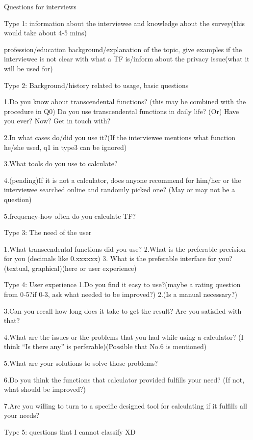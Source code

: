 \documentclass[12pt]{article}
\begin{document}
{\huge Questions for interviews} 
 
Type 1: information about the interviewee and knowledge about the survey(this would take about 4-5 mins)

profession/education background/explanation of the topic, give examples if the interviewee is not clear with what a TF is/inform about the privacy issue(what it will be used for)

Type 2: Background/history related to usage, basic questions

1.Do you know about transcendental functions? (this may be combined with the procedure in Q0)
Do you use transcendental functions in daily life?
(Or) Have you ever? Now? Get in touch with?

2.In what cases do/did you use it?(If the interviewee mentions what function he/she used, q1 in type3 can be ignored)
 
3.What tools do you use to calculate?

4.(pending)If it is not a calculator, does anyone recommend for him/her or the interviewee searched online and randomly picked one? (May or may not be a question)

5.frequency-how often do you calculate TF?

Type 3: The need of the user

1.What transcendental functions did you use?
2.What is the preferable precision for you (decimals like 0.xxxxxx)
3. What is the preferable interface for you? (textual, graphical)(here or user experience)
 
Type 4: User experience
1.Do you find it easy to use?(maybe a rating question from 0-5?if 0-3, ask what needed to be improved?)
2.(Is a manual necessary?)

3.Can you recall how long does it take to get the result? Are you satisfied with that?

4.What are the issues or the problems that you had while using a calculator?
(I think “Is there any” is perferable)(Possible that No.6 is mentioned)

5.What are your solutions to solve those problems?

6.Do you think the functions that calculator provided fulfills your need? (If not, what should be improved?)
 
7.Are you willing to turn to a specific designed tool for calculating if it fulfills all your needs?
 

Type 5: questions that I cannot classify XD
\end{document}

